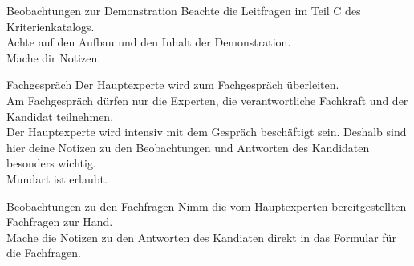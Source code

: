 \begin{taskitem}{Beobachtungen zur Demonstration}
  Beachte die Leitfragen im Teil C des Kriterienkatalogs.\\
  Achte auf den Aufbau und den Inhalt der Demonstration.\\
  Mache dir Notizen.
\end{taskitem}
\begin{taskitemwithoutcomment}{Fachgespräch}
  Der Hauptexperte wird zum Fachgespräch überleiten.\\
  Am Fachgespräch dürfen nur die Experten, die verantwortliche Fachkraft und der Kandidat teilnehmen.\\
  Der Hauptexperte wird intensiv mit dem Gespräch beschäftigt sein. Deshalb sind hier deine Notizen zu den Beobachtungen und Antworten des Kandidaten besonders wichtig.\\
  Mundart ist erlaubt.
\end{taskitemwithoutcomment}
\begin{taskitemwithoutcomment}{Beobachtungen zu den Fachfragen}
  Nimm die vom Hauptexperten bereitgestellten Fachfragen zur Hand.\\
  Mache die Notizen zu den Antworten des Kandiaten direkt in das Formular für die Fachfragen.
\end{taskitemwithoutcomment}
